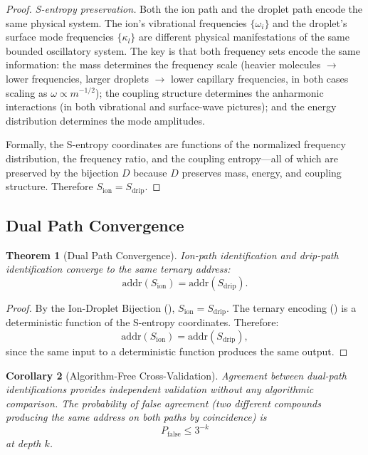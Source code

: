 \documentclass[11pt,twocolumn,a4paper]{article}
\newtheorem{theorem}{Theorem}[section]
\newtheorem{corollary}[theorem]{Corollary}
\theoremstyle{definition}
\theoremstyle{remark}
\begin{document}
\begin{proof}
\textit{S-entropy preservation.} Both the ion path and the droplet path encode the same physical system. The ion's vibrational frequencies $\{\omega_i\}$ and the droplet's surface mode frequencies $\{\kappa_l\}$ are different physical manifestations of the same bounded oscillatory system. The key is that both frequency sets encode the same information: the mass determines the frequency scale (heavier molecules $\to$ lower frequencies, larger droplets $\to$ lower capillary frequencies, in both cases scaling as $\omega \propto m^{-1/2}$); the coupling structure determines the anharmonic interactions (in both vibrational and surface-wave pictures); and the energy distribution determines the mode amplitudes.

Formally, the S-entropy coordinates are functions of the normalized frequency distribution, the frequency ratio, and the coupling entropy---all of which are preserved by the bijection $D$ because $D$ preserves mass, energy, and coupling structure. Therefore $S_{\mathrm{ion}} = S_{\mathrm{drip}}$.
\end{proof}

\subsection{Dual Path Convergence}\label{sec:dual-convergence}

\begin{theorem}[Dual Path Convergence]\label{thm:dual-convergence}
Ion-path identification and drip-path identification converge to the same ternary address:
\begin{equation}\label{eq:dual-convergence}
  \mathrm{addr}(S_{\mathrm{ion}}) = \mathrm{addr}(S_{\mathrm{drip}}).
\end{equation}
\end{theorem}

\begin{proof}
By the Ion-Droplet Bijection (), $S_{\mathrm{ion}} = S_{\mathrm{drip}}$. The ternary encoding () is a deterministic function of the S-entropy coordinates. Therefore:
\[
  \mathrm{addr}(S_{\mathrm{ion}}) = \mathrm{addr}(S_{\mathrm{drip}}),
\]
since the same input to a deterministic function produces the same output.
\end{proof}

\begin{corollary}[Algorithm-Free Cross-Validation]\label{cor:cross-validation}
Agreement between dual-path identifications provides independent validation without any algorithmic comparison. The probability of false agreement (two different compounds producing the same address on both paths by coincidence) is
\begin{equation}\label{eq:false-positive}
  P_{\mathrm{false}} \leq 3^{-k}
\end{equation}
at depth $k$.
\end{corollary}
\end{document}
